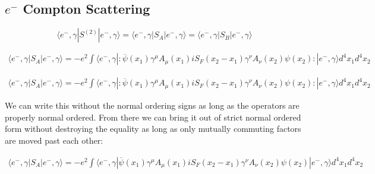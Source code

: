 \documentclass[a4]{article}
\begin{document}
        \subsection{$e^{-}$ Compton Scattering}

        \begin{framed}
            \begin{equation}
                \langle e^{-}, \gamma | S^{(2)} | e^{-}, \gamma \rangle = \langle e^{-}, \gamma | S_{A} | e^{-}, \gamma \rangle = \langle e^{-}, \gamma | S_{B} | e^{-}, \gamma \rangle
            \end{equation}

            \begin{equation}
                \begin{aligned}
                    \langle e^{-}, \gamma | S_{A} | e^{-}, \gamma \rangle = - e^{2} \int \langle e^{-}, \gamma |:\overline{\psi} (x_1) \gamma^{\mu} A_{\mu} (x_1) i S_{F} (x_2 - x_1) \gamma^{\nu} A_{\nu} (x_2) \psi (x_2):| e^{-}, \gamma \rangle d^{4} x_{1} d^{4} x_{2}
                \end{aligned}
            \end{equation}

            \begin{equation}
                \begin{aligned}
                    \langle e^{-}, \gamma | S_{A} | e^{-}, \gamma \rangle = - e^{2} \int \langle e^{-}, \gamma |:\overline{\psi} (x_1) \gamma^{\mu} A_{\mu} (x_1) i S_{F} (x_2 - x_1) \gamma^{\nu} A_{\nu} (x_2) \psi (x_2):| e^{-}, \gamma \rangle d^{4} x_{1} d^{4} x_{2}
                \end{aligned}
            \end{equation}

            We can write this without the normal ordering signs as long as the operators are properly normal ordered. From there we can bring it out of strict normal
            ordered form without destroying the equality as long as only mutually commuting factors are moved past each other: 

            \begin{equation}
                \begin{aligned}
                    \langle e^{-}, \gamma | S_{A} | e^{-}, \gamma \rangle = - e^{2} \int \langle e^{-}, \gamma |\overline{\psi} (x_1) \gamma^{\mu} A_{\mu} (x_1) i S_{F} (x_2 - x_1) \gamma^{\nu} A_{\nu} (x_2) \psi (x_2)| e^{-}, \gamma \rangle d^{4} x_{1} d^{4} x_{2}
                \end{aligned}
            \end{equation}


\end{framed}
\end{document}
